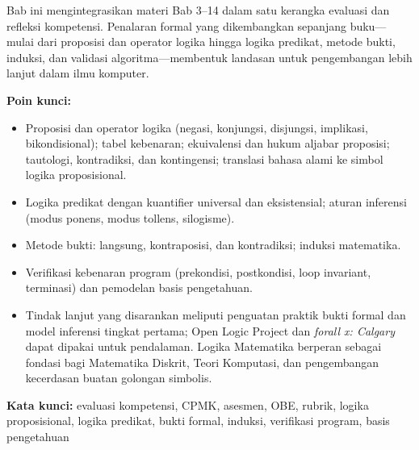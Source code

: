 \documentclass[../main]{subfiles}
\begin{document}
\begin{rangkuman}
Bab ini mengintegrasikan materi Bab 3--14 dalam satu kerangka evaluasi dan refleksi kompetensi. Penalaran formal yang dikembangkan sepanjang buku---mulai dari proposisi dan operator logika hingga logika predikat, metode bukti, induksi, dan validasi algoritma---membentuk landasan untuk pengembangan lebih lanjut dalam ilmu komputer.

\textbf{Poin kunci:}
\begin{itemize}
  \item Proposisi dan operator logika (negasi, konjungsi, disjungsi, implikasi, bikondisional); tabel kebenaran; ekuivalensi dan hukum aljabar proposisi; tautologi, kontradiksi, dan kontingensi; translasi bahasa alami ke simbol logika proposisional.
  \item Logika predikat dengan kuantifier universal dan eksistensial; aturan inferensi (modus ponens, modus tollens, silogisme).
  \item Metode bukti: langsung, kontraposisi, dan kontradiksi; induksi matematika.
  \item Verifikasi kebenaran program (prekondisi, postkondisi, loop invariant, terminasi) dan pemodelan basis pengetahuan.
  \item Tindak lanjut yang disarankan meliputi penguatan praktik bukti formal dan model inferensi tingkat pertama; Open Logic Project dan \textit{forall x: Calgary} dapat dipakai untuk pendalaman. Logika Matematika berperan sebagai fondasi bagi Matematika Diskrit, Teori Komputasi, dan pengembangan kecerdasan buatan golongan simbolis.
\end{itemize}

\textbf{Kata kunci:} evaluasi kompetensi, CPMK, asesmen, OBE, rubrik, logika proposisional, logika predikat, bukti formal, induksi, verifikasi program, basis pengetahuan
\end{rangkuman}

\ifSubfilesClassLoaded{
  \renewcommand{\bibname}{Daftar Pustaka}
  
  
}{}
\end{document}

